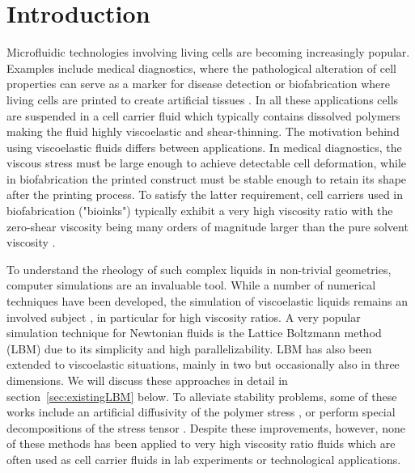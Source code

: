 \documentclass[a4paper,12pt]{scrartcl}
\begin{document}
\clearpage


\section{Introduction}

Microfluidic technologies involving living cells are becoming increasingly popular.
Examples include medical diagnostics, where the pathological alteration of cell properties can serve as a marker for disease detection \cite{Toepfner.2018} or biofabrication where living cells are printed to create artificial tissues \cite{possl2021, Poologasundarampillai.2021, oconnell2022}.
In all these applications cells are suspended in a cell carrier fluid which typically contains dissolved polymers making the fluid highly viscoelastic and shear-thinning.
The motivation behind using viscoelastic fluids differs between applications.
In medical diagnostics, the viscous stress must be large enough to achieve detectable cell deformation, while in biofabrication the printed construct must be stable enough to retain its shape after the printing process.
To satisfy the latter requirement, cell carriers used in biofabrication ("bioinks") typically exhibit a very high viscosity ratio with the zero-shear viscosity being many orders of magnitude larger than the pure solvent viscosity \cite{paxton2017}.

To understand the rheology of such complex liquids in non-trivial geometries, computer simulations are an invaluable tool.
While a number of numerical techniques have been developed, the simulation of viscoelastic liquids remains an involved subject \cite{Alves.2020}, in particular for high viscosity ratios.
A very popular simulation technique for Newtonian fluids is the Lattice Boltzmann method (LBM) \cite{Kruger_book} due to its simplicity and high parallelizability.
LBM has also been extended to viscoelastic situations, mainly in two \cite{ispolatov2002,wang2019,su2013,giraud1998,xie2018,dzanic2022,frank2006,zou2014,lee2017,dzanic2022_2,sedaghat2021,frantziskonis2011,qin2023,yoshino2008,papenkort2015,phillips2011,onishi2005} but occasionally also in three \cite{malaspinas2010,gupta2015,gupta2015_2,lallemand2003,ma2020,onishi2006,wang2020,dellar2014,su2013_2,wang2021,kuron2021,gupta2016} dimensions.
We will discuss these approaches in detail in section~\ref{sec:existingLBM} below.
To alleviate stability problems, some of these works include an artificial diffusivity of the polymer stress \cite{malaspinas2010,ma2020,wang2020,wang2021}, or perform special decompositions of the stress tensor \cite{dzanic2022}.
Despite these improvements, however, none of these methods has been applied to very high viscosity ratio fluids which are often used as cell carrier fluids in lab experiments or technological applications.
\end{document}
